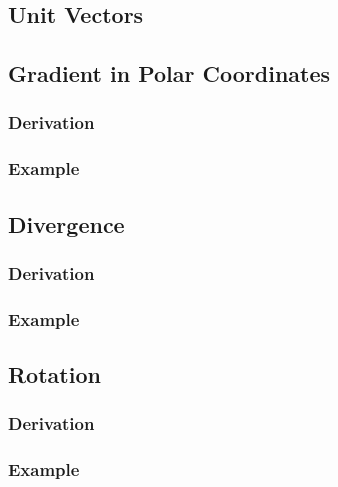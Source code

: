 \documentclass[12pt]{article}
\begin{document}
\subsection{Unit Vectors}
\subsection{Gradient in Polar Coordinates}
\subsubsection{Derivation}
\subsubsection{Example}
\subsection{Divergence}
\subsubsection{Derivation}
\subsubsection{Example}
\subsection{Rotation}
\subsubsection{Derivation}
\subsubsection{Example}




\end{document}
